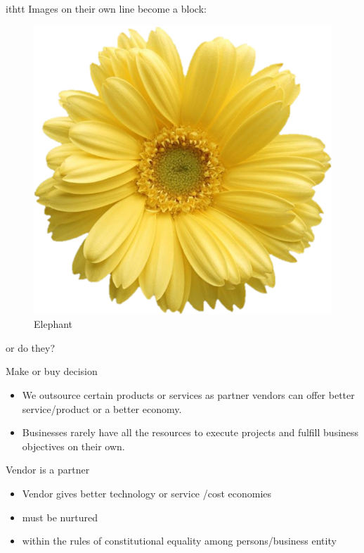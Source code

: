 \documentclass[
  10pt,
  ignorenonframetext,
  aspectratio=43,
]{beamer}
\providecommand{\tightlist}{%
  \setlength{\itemsep}{0pt}\setlength{\parskip}{0pt}}
\begin{document}
\begin{frame}{ithtt}
Images on their own line become a block:

\begin{figure}
\centering
\includegraphics{flowery.png}
\caption{Elephant}
\end{figure}

or do they?

\begin{block}{Make or buy decision}
\protect\hypertarget{make-or-buy-decision}{}
\begin{itemize}
\tightlist
\item
  We outsource certain products or services as partner vendors can offer
  better service/product or a better economy.
\item
  Businesses rarely have all the resources to execute projects and
  fulfill business objectives on their own.
\end{itemize}
\end{block}

\begin{block}{Vendor is a partner}
\protect\hypertarget{vendor-is-a-partner}{}
\begin{itemize}
\tightlist
\item
  Vendor gives better technology or service /cost economies
\item
  must be nurtured
\item
  within the rules of constitutional equality among persons/business
  entity
\end{itemize}
\end{block}
\end{frame}
\end{document}

